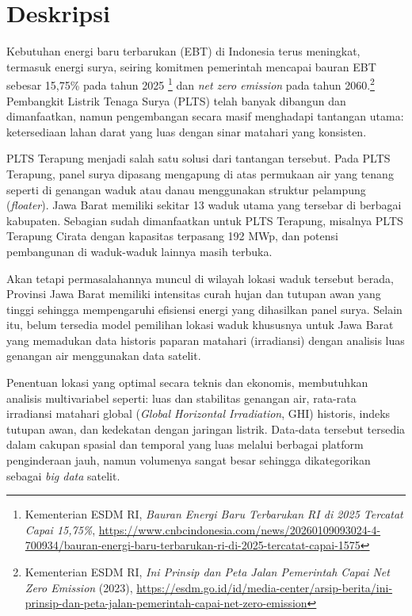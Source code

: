 \documentclass[a4paper,twoside]{article}
\title{\judultopik}
\author{\nama\ \textendash\ \npm}
\renewcommand{\thispagestyle}[1]{}
\begin{document}
\maketitle
\thispagestyle{myheadings} 


\section{Deskripsi}
Kebutuhan energi baru terbarukan (EBT) di Indonesia terus meningkat, termasuk energi
surya, seiring komitmen pemerintah mencapai bauran EBT sebesar 15,75\% pada tahun
2025 \footnote{Kementerian ESDM RI, \textit{Bauran Energi Baru Terbarukan RI di 2025
Tercatat Capai 15,75\%},
\url{https://www.cnbcindonesia.com/news/20260109093024-4-700934/bauran-energi-baru-terbarukan-ri-di-2025-tercatat-capai-1575}} dan \textit{net zero emission}
pada tahun 2060.\footnote{Kementerian ESDM RI, \textit{Ini Prinsip dan Peta Jalan
Pemerintah Capai Net Zero Emission} (2023),
\url{https://esdm.go.id/id/media-center/arsip-berita/ini-prinsip-dan-peta-jalan-pemerintah-capai-net-zero-emission}} 
Pembangkit Listrik Tenaga Surya (PLTS) telah banyak dibangun dan
dimanfaatkan, namun pengembangan secara masif menghadapi tantangan utama:
ketersediaan lahan darat yang luas dengan sinar matahari yang konsisten.

PLTS Terapung menjadi salah satu solusi dari tantangan tersebut. Pada PLTS Terapung,
panel surya dipasang mengapung di atas permukaan air yang tenang seperti di genangan 
waduk atau danau menggunakan struktur pelampung (\textit{floater}). Jawa Barat
memiliki sekitar 13 waduk utama yang tersebar di berbagai kabupaten. Sebagian sudah
dimanfaatkan untuk PLTS Terapung, misalnya PLTS Terapung Cirata dengan kapasitas
terpasang 192 MWp, dan potensi pembangunan di waduk-waduk lainnya masih terbuka.
 
Akan tetapi permasalahannya muncul di wilayah lokasi waduk tersebut berada, Provinsi
Jawa Barat memiliki intensitas curah hujan dan tutupan awan yang tinggi sehingga
mempengaruhi efisiensi energi yang dihasilkan panel surya. Selain itu, belum
tersedia model pemilihan lokasi waduk khususnya untuk Jawa Barat yang memadukan
data historis paparan matahari (irradiansi) dengan analisis luas genangan air
menggunakan data satelit.
 
Penentuan lokasi yang optimal secara teknis dan ekonomis, membutuhkan
analisis multivariabel seperti: luas dan stabilitas genangan air,
rata-rata irradiansi matahari global (\textit{Global Horizontal
Irradiation}, GHI) historis, indeks tutupan awan, dan kedekatan dengan
jaringan listrik. Data-data tersebut tersedia dalam cakupan spasial dan
temporal yang luas melalui berbagai platform penginderaan jauh, namun
volumenya sangat besar sehingga dikategorikan sebagai \textit{big data}
satelit.
 
\end{document}
